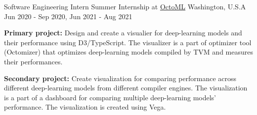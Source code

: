 

\begin{cventries}

  \cventry
    {Software Engineering Intern} %
    {Summer Internship at \href{https://octoml.ai/}{OctoML}} %
    {Washington, U.S.A} %
    {Jun 2020 - Sep 2020, Jun 2021 - Aug 2021} %
    {
      \begin{cvitems} %
        \item {
          \textbf{Primary project:} Design and create a visualier for deep-learning models and their performance using D3/TypeScript.
          The visualizer is a part of optimizer tool (Octomizer) that optimizes deep-learning models compiled by TVM and measures their performances.
        }
        \item {
          \textbf{Secondary project:} Create visualization for comparing performance across different deep-learning models from different compiler engines.
          The visualization is a part of a dashboard for comparing multiple deep-learning models' performance.
          The visualization is created using Vega.
        }
      \end{cvitems}
    }


\end{cventries}
